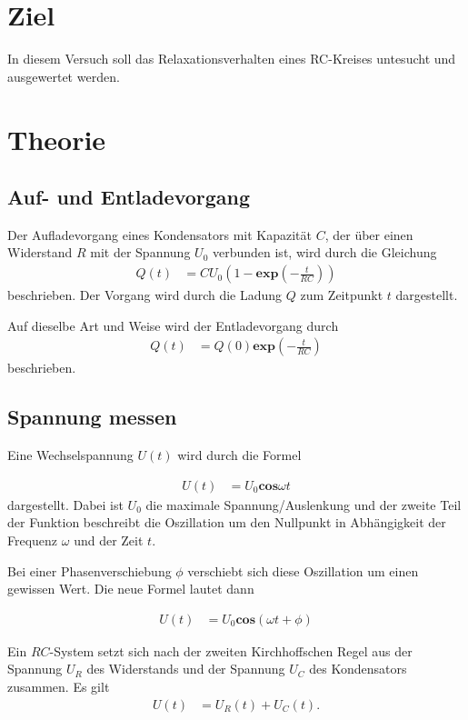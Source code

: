 
\section{Ziel}
In diesem Versuch soll das Relaxationsverhalten eines RC-Kreises untesucht und ausgewertet werden. 

\section{Theorie }
\label{sec:Theorie}
\subsection{Auf- und Entladevorgang}

Der Aufladevorgang eines Kondensators mit Kapazität $C$, der über einen Widerstand $R$ mit der Spannung $U_{0}$ verbunden ist, wird durch die Gleichung
\begin{align*}
     Q(t)&= CU_{0} (1-\mathbf{exp}(-\frac{t}{RC}))
\end{align*}
beschrieben. Der Vorgang wird durch die Ladung $Q$ zum Zeitpunkt $t$ dargestellt. 

Auf dieselbe Art und Weise wird der Entladevorgang durch
\begin{align*}
     Q(t)&= Q(0) \mathbf{exp}(-\frac{t}{RC})
\end{align*}
beschrieben. 

\subsection{Spannung messen}

Eine Wechselspannung $U(t)$ wird durch die Formel 

\begin{align*} 
    U(t)&= U_{0} \mathbf{cos}\omega t 
\end{align*}
dargestellt. Dabei ist $U_{0}$ die maximale Spannung/Auslenkung und der zweite Teil der Funktion beschreibt die Oszillation um den Nullpunkt in Abhängigkeit der Frequenz $\omega$ und der Zeit $t$. 

Bei einer Phasenverschiebung $\phi$ verschiebt sich diese Oszillation um einen gewissen Wert. Die neue Formel lautet dann 

\begin{align*} 
    U(t)&= U_{0} \mathbf{cos}(\omega t + \phi)
\end{align*}

Ein $RC$-System setzt sich nach der zweiten Kirchhoffschen Regel aus der Spannung $U_{R}$ des Widerstands und der Spannung $U_{C}$ des Kondensators zusammen.
Es gilt 
\begin{align*} 
    U(t) &= U_{R}(t) + U_{C}(t).
\end{align*}

